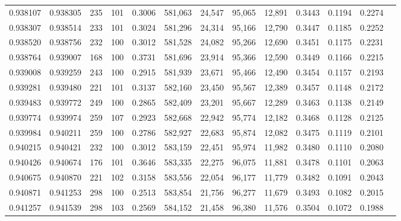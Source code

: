 \begin{tabular}{rrrrrrrrrrrrr}
0.938107 & 0.938305 &   235 & 101 &                                     0.3006 & 581,063 &  24,547 &  95,065 &  12,891 & 0.3443 & 0.1194 & 0.2274 \\
0.938307 & 0.938514 &   233 & 101 &                                     0.3024 & 581,296 &  24,314 &  95,166 &  12,790 & 0.3447 & 0.1185 & 0.2252 \\
0.938520 & 0.938756 &   232 & 100 &                                     0.3012 & 581,528 &  24,082 &  95,266 &  12,690 & 0.3451 & 0.1175 & 0.2231 \\
0.938764 & 0.939007 &   168 & 100 &                                     0.3731 & 581,696 &  23,914 &  95,366 &  12,590 & 0.3449 & 0.1166 & 0.2215 \\
0.939008 & 0.939259 &   243 & 100 &                                     0.2915 & 581,939 &  23,671 &  95,466 &  12,490 & 0.3454 & 0.1157 & 0.2193 \\
0.939281 & 0.939480 &   221 & 101 &                                     0.3137 & 582,160 &  23,450 &  95,567 &  12,389 & 0.3457 & 0.1148 & 0.2172 \\
0.939483 & 0.939772 &   249 & 100 &                                     0.2865 & 582,409 &  23,201 &  95,667 &  12,289 & 0.3463 & 0.1138 & 0.2149 \\
0.939774 & 0.939974 &   259 & 107 &                                     0.2923 & 582,668 &  22,942 &  95,774 &  12,182 & 0.3468 & 0.1128 & 0.2125 \\
0.939984 & 0.940211 &   259 & 100 &                                     0.2786 & 582,927 &  22,683 &  95,874 &  12,082 & 0.3475 & 0.1119 & 0.2101 \\
0.940215 & 0.940421 &   232 & 100 &                                     0.3012 & 583,159 &  22,451 &  95,974 &  11,982 & 0.3480 & 0.1110 & 0.2080 \\
0.940426 & 0.940674 &   176 & 101 &                                     0.3646 & 583,335 &  22,275 &  96,075 &  11,881 & 0.3478 & 0.1101 & 0.2063 \\
0.940675 & 0.940870 &   221 & 102 &                                     0.3158 & 583,556 &  22,054 &  96,177 &  11,779 & 0.3482 & 0.1091 & 0.2043 \\
0.940871 & 0.941253 &   298 & 100 &                                     0.2513 & 583,854 &  21,756 &  96,277 &  11,679 & 0.3493 & 0.1082 & 0.2015 \\
0.941257 & 0.941539 &   298 & 103 &                                     0.2569 & 584,152 &  21,458 &  96,380 &  11,576 & 0.3504 & 0.1072 & 0.1988 \\

\end{tabular}
